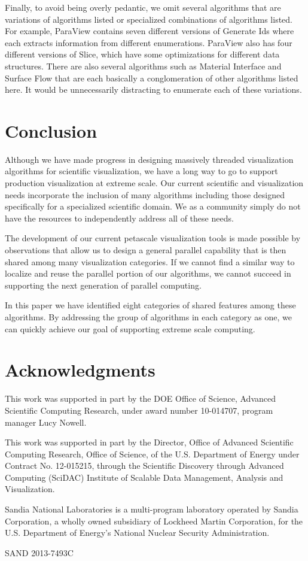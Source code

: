 \documentclass{sig-alternate}
\newcommand{\alg}[1]{#1}
\begin{document}
Finally, to avoid being overly pedantic, we omit several algorithms that
are variations of algorithms listed or specialized combinations of
algorithms listed. For example, ParaView contains seven different versions
of \alg{Generate Ids} where each extracts information from different
enumerations. ParaView also has four different versions of \alg{Slice},
which have some optimizations for different data structures. There are also
several algorithms such as \alg{Material Interface} and \alg{Surface Flow}
that are each basically a conglomeration of other algorithms listed here.
It would be unnecessarily distracting to enumerate each of these
variations.


\section{Conclusion}
\label{sec:Conclusion}

\noindent
Although we have made progress in designing massively threaded
visualization algorithms for scientific visualization, we have a long way
to go to support production visualization at extreme scale. Our current
scientific and visualization needs incorporate the inclusion of many
algorithms including those designed specifically for a specialized
scientific domain. We as a community simply do not have the resources to
independently address all of these needs.

The development of our current petascale visualization tools is made
possible by observations that allow us to design a general parallel
capability that is then shared among many visualization categories. If we
cannot find a similar way to localize and reuse the parallel portion of our
algorithms, we cannot succeed in supporting the next generation of parallel
computing.

In this paper we have identified eight categories of shared features among
these algorithms. By addressing the group of algorithms in each category as
one, we can quickly achieve our goal of supporting extreme scale computing.


\section{Acknowledgments}

\noindent
This work was supported in part by the DOE Office of Science, Advanced
Scientific Computing Research, under award number 10-014707, program
manager Lucy Nowell.

This work was supported in part by the Director, Office of Advanced
Scientific Computing Research, Office of Science, of the U.S. Department of
Energy under Contract No. 12-015215, through the Scientific Discovery
through Advanced Computing (SciDAC) Institute of Scalable Data Management,
Analysis and Visualization.

Sandia National Laboratories is a multi-program laboratory operated by
Sandia Corporation, a wholly owned subsidiary of Lockheed Martin
Corporation, for the U.S. Department of Energy's National Nuclear Security
Administration.

\noindent
{\small SAND 2013-7493C}




\end{document}
